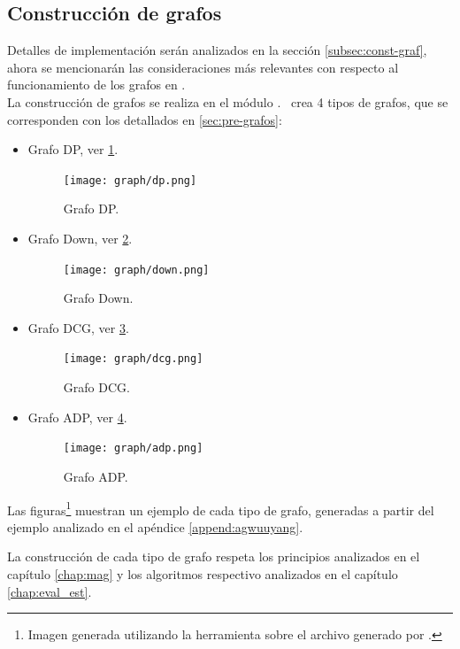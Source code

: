 \subsection{Construcción de grafos}
\label{subsec:graph}

Detalles de implementación serán analizados en la sección \ref{subsec:const-graf}, ahora se mencionarán las consideraciones más relevantes con respecto al funcionamiento de los grafos en \maggen.\\

La construcción de grafos se realiza en el módulo . \maggen\ crea 4 tipos de grafos, que se corresponden con los detallados en \ref{sec:pre-grafos}:

\begin{itemize}
\item Grafo DP, ver \ref{dpgraph}.
  \begin{figure}[!ht]\centering
    \texttt{[image: graph/dp.png]}
  \caption{\label{dpgraph} Grafo DP.}
  \end{figure}

\item Grafo Down, ver \ref{downgraph}.
  \begin{figure}[!ht]\centering
    \texttt{[image: graph/down.png]}
  \caption{\label{downgraph} Grafo Down.}
  \end{figure}

\item Grafo DCG, ver \ref{dcggraph}.
  \begin{figure}[!ht]\centering
    \texttt{[image: graph/dcg.png]}
  \caption{\label{dcggraph} Grafo DCG.}
  \end{figure}

\item Grafo ADP, ver \ref{adpgraph}.
  \begin{figure}[!ht]\centering
    \texttt{[image: graph/adp.png]}
  \caption{\label{adpgraph} Grafo ADP.}
  \end{figure}
\end{itemize}

Las figuras\footnote{\label{foot:graph} Imagen generada utilizando la herramienta  sobre el archivo  generado por \maggen.} muestran un ejemplo de cada tipo de grafo, generadas a partir del ejemplo analizado en el apéndice \ref{append:agwuuyang}.

La construcción de cada tipo de grafo respeta los principios analizados en el capítulo \ref{chap:mag} y los algoritmos respectivo analizados en el capítulo \ref{chap:eval_est}. 


